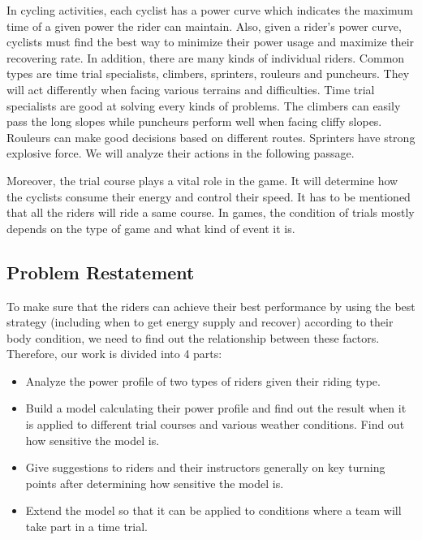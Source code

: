 \documentclass[12pt]{article}
\theoremstyle{definition}
\theoremstyle{remark}
\numberwithin{equation}{section}
\begin{document}
	In cycling activities, each cyclist has a power curve which indicates the maximum time of a given power the rider can maintain. Also, given a rider's power curve, cyclists must find the best way to minimize their power usage and maximize their recovering rate. In addition, there are many kinds of individual riders. Common types are time trial specialists, climbers, sprinters, rouleurs and puncheurs. They will act differently when facing various terrains and difficulties. Time trial specialists are good at solving every kinds of problems. The climbers can easily pass the long slopes while puncheurs perform well when facing cliffy slopes. Rouleurs can make good decisions based on different routes. Sprinters have strong explosive force. We will analyze their actions in the following passage.

	Moreover, the trial course plays a vital role in the game. It will determine how the cyclists consume their energy and control their speed. It has to be mentioned that all the riders will ride a same course. In games, the condition of trials mostly depends on the type of game and what kind of event it is.
	\subsection{Problem Restatement}
	To make sure that the riders can achieve their best performance by using the best strategy (including when to get energy supply and recover) according  to their body condition, we need to find out the relationship between these factors. Therefore, our work is divided into 4 parts:
	\begin{itemize}
		\item  Analyze the power profile of two types of riders given their riding type.
		\item  Build a model calculating their power profile and find out the result when it is applied to different trial courses and various weather conditions. Find out how sensitive the model is.
		\item  Give suggestions to riders and their instructors generally on key turning points after determining how sensitive the model is.
		\item  Extend the model so that it can be applied to conditions where a team will take part in a time trial.
	\end{itemize}
\end{document}
